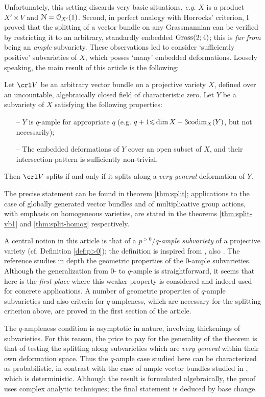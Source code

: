 \documentclass[11pt,reqno]{amsart}
\let\euf\EuScript
\let\nit\noindent
\numberwithin{equation}{section}
\numberwithin{figure}{section}
\let\les\leqslant
\begin{document}
Unfortunately, this setting discards very basic situations, \textit{e.g.} $X$ is a product 
$X'\times V$ and ${{\euf N}}={{\euf O}}_{X'}(1)$. 
Second, in perfect analogy with Horrocks' criterion, I proved that the splitting of a vector 
bundle on any Grassmannian can be verified by restricting it to an arbitrary, standardly 
embedded ${\rm Grass}(2;4)$; this is \emph{far from} being an \emph{ample} 
subvariety. These observations led to consider `sufficiently positive' 
subvarieties of $X$, which posses `many' embedded deformations. 
Loosely speaking, the main result of this article is the following:  
\begin{thm-nono}
Let $\crl V$ be an arbitrary vector bundle on a projective variety $X$, 
defined over an uncountable, algebraically closed field of characteristic zero. 
Let $Y$ be a subvariety of $X$ satisfying the following properties: 
\begin{enumerate}
\item[--] 
$Y$ is $q$-ample for appropriate $q$ 
(e.g. $q+1{\les}\dim X-3{{\rm codim}}_X(Y)$, but not necessarily); 
\item[--] 
The embedded deformations of $Y$ cover an open subset of $X$, 
and their intersection pattern is sufficiently non-trivial. 
\end{enumerate}
\nit Then $\crl V$ splits if and only if it splits along 
a \emph{very general} deformation of $Y$. 
\end{thm-nono}
The precise statement can be found in theorem \ref{thm:split}; applications to the case 
of globally generated vector bundles and of multiplicative group actions, 
with emphasis on homogeneous varieties, are stated in the theorems 
\ref{thm:split-vb1} and \ref{thm:split-homog} respectively. 

A central notion in this article is that of a \emph{$p^{{>0}}/q$-ample subvariety} of 
a projective variety (cf. Definition \ref{def:p>0}); the definition is inspired from 
\cite{ot,to,ar}, also \cite{dps}. The reference \cite{ot} studies in depth the geometric 
properties of the $0$-ample subvarieties. Although the generalization from $0$- to 
$q$-ample is straightforward, it seems that here is the \emph{first place} where 
this weaker property is considered and indeed used for concrete applications. 
A number of geometric properties of $q$-ample subvarieties and also criteria for 
$q$-ampleness, which are necessary for the splitting criterion above, are proved 
in the first section of the article.

The $q$-ampleness condition is asymptotic in nature, involving thickenings 
of subvarieties. For this reason, the price to pay for the generality of the theorem is that 
of testing the splitting along subvarieties which are \emph{very general} within their 
own deformation space. Thus the $q$-ample case studied here can be characterized 
as probabilistic, in contrast with the case of ample vector bundles studied in \cite{hal}, 
which is deterministic. Although the result is formulated algebraically, the proof uses 
complex analytic techniques; the final statement is deduced by base change.
\end{document}
